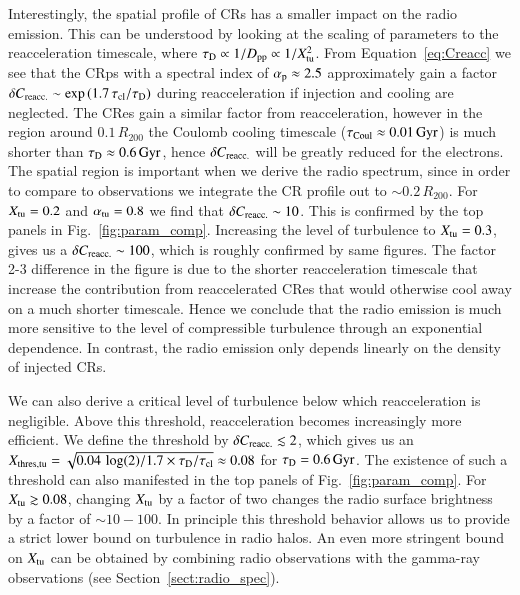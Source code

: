 \documentclass[fleqn,usenatbib,useAMS]{mnras}
\begin{document}
Interestingly, the spatial profile of CRs has a smaller impact on the
radio emission. This can be understood by looking at the scaling of
parameters to the reacceleration timescale, where $\tau_{\mathrm{D}}
\propto 1/D_{\mathrm{pp}} \propto 1/X_{\mathrm{tu}}^2$. From
Equation~\ref{eq:Creacc} we see that the CRps with a spectral index of
$\alpha_{\mathrm{p}}\approx2.5$ approximately gain a factor $\delta
C_{\mathrm{reacc.}} \sim \exp{(1.7\,\tau_{\mathrm{cl}}/\tau_{\mathrm{D}})}$ during
reacceleration if injection and cooling are neglected. The CRes gain a
similar factor from reacceleration, however in the region around
$0.1\,R_{200}$ the Coulomb cooling timescale
($\tau_{\mathrm{Coul}}\approx0.01\,{\mathrm{Gyr}}$) is much shorter than
$\tau_{\mathrm{D}}\approx0.6\,{\mathrm{Gyr}}$, hence $\delta C_{\mathrm{reacc.}}$
will be greatly reduced for the electrons. The spatial region is
important when we derive the radio spectrum, since in order to compare
to observations we integrate the CR profile out to $\sim
0.2\,R_{200}$. For $X_{\mathrm{tu}}=0.2$ and $\alpha_{\mathrm{tu}}=0.8$ we find
that $\delta C_{\mathrm{reacc.}} \sim 10$. This is confirmed by the top
panels in Fig.~\ref{fig:param_comp}. Increasing the level of
turbulence to $X_{\mathrm{tu}}=0.3$, gives us a $\delta C_{\mathrm{reacc.}}
\sim 100$, which is roughly confirmed by same figures. The factor 2-3
difference in the figure is due to the shorter reacceleration
timescale that increase the contribution from reaccelerated CRes that
would otherwise cool away on a much shorter timescale. Hence we
conclude that the radio emission is much more sensitive to the level
of compressible turbulence through an exponential dependence.  In
contrast, the radio emission only depends linearly on the density of
injected CRs.

We can also derive a critical level of turbulence below which
reacceleration is negligible. Above this threshold, reacceleration
becomes increasingly more efficient. We define the threshold by
$\delta C_{\mathrm{reacc.}}  \lesssim 2$, which gives us an
$X_{\mathrm{thres,tu}} = \sqrt{0.04\,\log(2)/1.7 \times
  \tau_{\mathrm{D}}/\tau_{\mathrm{cl}}} \approx 0.08$ for $\tau_{\mathrm{D}} =
0.6\,{\mathrm{Gyr}}$. The existence of such a threshold can also manifested
in the top panels of Fig.~\ref{fig:param_comp}. For
$X_{\mathrm{tu}}\gtrsim0.08$, changing $X_{\mathrm{tu}}$ by a factor of two
changes the radio surface brightness by a factor of $\sim 10-100$. In
principle this threshold behavior allows us to provide a strict lower
bound on turbulence in radio halos. An even more stringent bound on
$X_{\mathrm{tu}}$ can be obtained by combining radio observations with
the gamma-ray observations (see Section~\ref{sect:radio_spec}).
\end{document}

